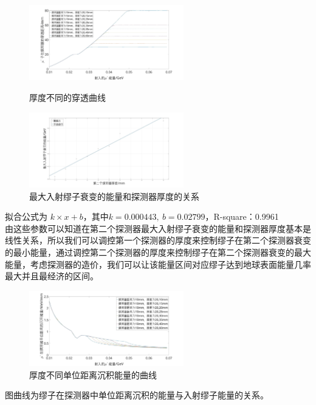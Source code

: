 \documentclass[aps,prd,superscriptaddress,nofootinbib,preprint]{ctexart}
\begin{document}
\begin{CJK}{UTF8}{gbsn}
\begin{figure}[h]
\centering
    \includegraphics[width=0.6\textwidth]{pic/dis.jpg}
    \caption{厚度不同的穿透曲线}\label{fig:di}
    \includegraphics[width=0.6\textwidth]{pic/quxian.jpg}
    \caption{最大入射缪子衰变的能量和探测器厚度的关系}\label{fig:di_linear}
\end{figure}


拟合公式为 $k\times x + b$，其中$k = 0.000443,\ b= 0.02799$，R-square：0.9961\\


由这些参数可以知道在第二个探测器最大入射缪子衰变的能量和探测器厚度基本是线性关系，所以我们可以调控第一个探测器的厚度来控制缪子在第二个探测器衰变的最小能量，通过调控第二个探测器的厚度来控制缪子在第二个探测器衰变的最大能量，考虑探测器的造价，我们可以让该能量区间对应缪子达到地球表面能量几率最大并且最经济的区间。\\

\begin{figure}[H]
\centering
    \includegraphics[width=0.6\textwidth]{pic/en_dis.jpg}
    \caption{厚度不同单位距离沉积能量的曲线}
\end{figure}

图曲线为缪子在探测器中单位距离沉积的能量与入射缪子能量的关系。





\end{CJK}
\end{document}
